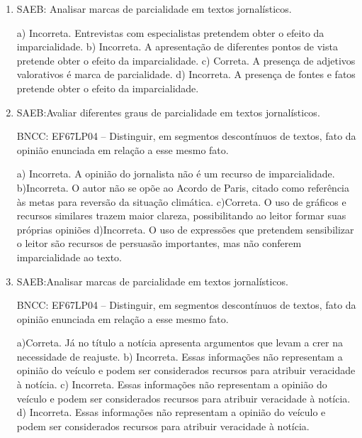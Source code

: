 \begin{enumerate}

\item
SAEB: Analisar marcas de parcialidade em textos jornalísticos.

a) Incorreta. Entrevistas com especialistas pretendem obter o efeito da 
imparcialidade.
b) Incorreta. A apresentação de diferentes pontos de vista pretende obter
o efeito da imparcialidade. 
c) Correta. A presença de adjetivos valorativos é marca de parcialidade.
d) Incorreta. A presença de fontes e fatos pretende obter
o efeito da imparcialidade.

\item
SAEB:Avaliar diferentes graus de parcialidade em textos jornalísticos.

BNCC: EF67LP04 -- Distinguir, em segmentos descontínuos de textos,
fato da opinião enunciada em relação a esse mesmo fato.

a) Incorreta. A opinião do jornalista não é um recurso de imparcialidade.
b)Incorreta. O autor não se opõe ao Acordo de Paris, citado como referência às metas
para reversão da situação climática.
c)Correta. O uso de gráficos e recursos similares trazem maior clareza, possibilitando
ao leitor formar suas próprias opiniões
d)Incorreta. O uso de expressões que pretendem sensibilizar o leitor são recursos de
persuasão importantes, mas não conferem imparcialidade ao texto.

\item
SAEB:Analisar marcas de parcialidade em textos jornalísticos.

BNCC: EF67LP04 -- Distinguir, em segmentos descontínuos de textos,
fato da opinião enunciada em relação a esse mesmo fato.

a)Correta. Já no título a notícia apresenta argumentos que levam a crer na
necessidade de reajuste.
b) Incorreta. Essas informações não representam a opinião do veículo e 
podem ser considerados recursos para atribuir veracidade à notícia.
c) Incorreta. Essas informações não representam a opinião do veículo e 
podem ser considerados recursos para atribuir veracidade à notícia.
d) Incorreta. Essas informações não representam a opinião do veículo e 
podem ser considerados recursos para atribuir veracidade à notícia.

\end{enumerate}


